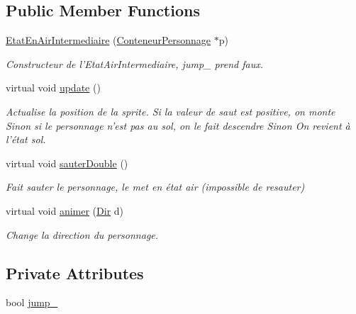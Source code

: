 \subsection*{Public Member Functions}
\begin{DoxyCompactItemize}
\item 
\hyperlink{classEtatEnAirIntermediaire_a59844afce97c67b35aa4e28f668d3dbc}{Etat\-En\-Air\-Intermediaire} (\hyperlink{classConteneurPersonnage}{Conteneur\-Personnage} $\ast$p)
\begin{DoxyCompactList}\small\item\em Constructeur de l'Etat\-Air\-Intermediaire, jump\-\_\- prend faux. \end{DoxyCompactList}\item 
\hypertarget{classEtatEnAirIntermediaire_a29d5f6372f675f9ef5cf5f3c110518e7}{virtual void \hyperlink{classEtatEnAirIntermediaire_a29d5f6372f675f9ef5cf5f3c110518e7}{update} ()}\label{classEtatEnAirIntermediaire_a29d5f6372f675f9ef5cf5f3c110518e7}

\begin{DoxyCompactList}\small\item\em Actualise la position de la sprite. Si la valeur de saut est positive, on monte Sinon si le personnage n'est pas au sol, on le fait descendre Sinon On revient à l'état sol. \end{DoxyCompactList}\item 
\hypertarget{classEtatEnAirIntermediaire_a6cd8320848caf077d9030b317e56baa3}{virtual void \hyperlink{classEtatEnAirIntermediaire_a6cd8320848caf077d9030b317e56baa3}{sauter\-Double} ()}\label{classEtatEnAirIntermediaire_a6cd8320848caf077d9030b317e56baa3}

\begin{DoxyCompactList}\small\item\em Fait sauter le personnage, le met en état air (impossible de resauter) \end{DoxyCompactList}\item 
virtual void \hyperlink{classEtatEnAirIntermediaire_a5f76538481f37888d7c6de112aeee7d2}{animer} (\hyperlink{Espace_8h_a7cf6e8c5a5bc5e7b2afef3647870b1c4}{Dir} d)
\begin{DoxyCompactList}\small\item\em Change la direction du personnage. \end{DoxyCompactList}\end{DoxyCompactItemize}
\subsection*{Private Attributes}
\begin{DoxyCompactItemize}
\item 
bool \hyperlink{classEtatEnAirIntermediaire_afdba4ed744f4f08ef0079bcbcd48ca08}{jump\-\_\-}
\end{DoxyCompactItemize}
